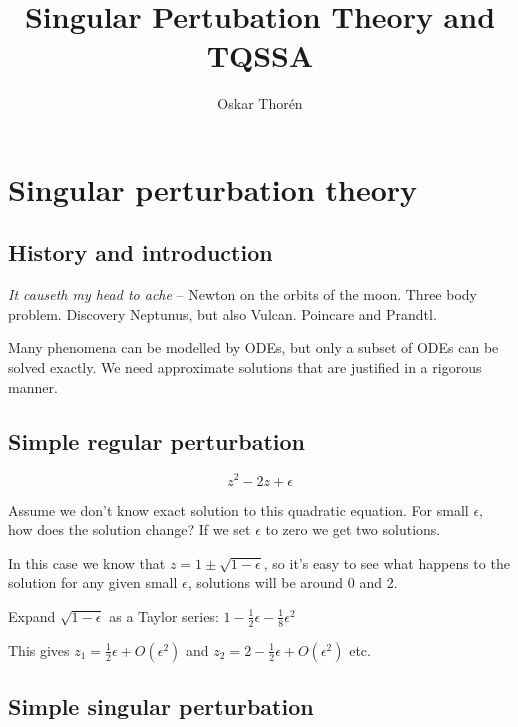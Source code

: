 \documentclass[12pt]{report}
\begin{document}


\title{Singular Pertubation Theory and TQSSA}
\author{Oskar Thor\'{e}n}

\maketitle

\chapter{Singular perturbation theory}

\section{History and introduction}

\textit{It causeth my head to ache} -- Newton on the orbits of the moon. Three
body problem. Discovery Neptunus, but also Vulcan. Poincare and Prandtl.

Many phenomena can be modelled by ODEs, but only a subset of ODEs can be solved
exactly. We need approximate solutions that are justified in a rigorous manner.

\section{Simple regular perturbation}

\begin{equation}
  z^2 - 2z + \epsilon
\end{equation}

Assume we don't know exact solution to this quadratic equation. For small
$\epsilon$, how does the solution change? If we set $\epsilon$ to zero we get
two solutions.

In this case we know that $z=1 \pm \sqrt{1 - \epsilon}$, so it's easy to see what happens to the solution for any given small $\epsilon$, solutions will be around 0 and 2.

Expand $\sqrt{1 - \epsilon}$ as a Taylor series: $1 - \frac 1 2 \epsilon - \frac 1 8 \epsilon^2$

This gives $z_1 = \frac 1 2 \epsilon + O(\epsilon^2)$ and $z_2 = 2 - \frac 1 2 \epsilon + O(\epsilon^2)$ etc.

\section{Simple singular perturbation}
\end{document}

